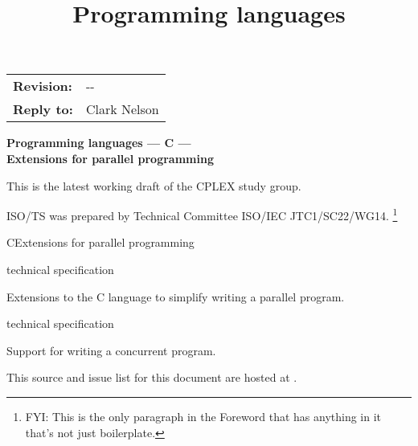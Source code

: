 \documentclass[
	techspec,	%
	final,		%
	notcopyright,	%
	letterpaper	%
	]{isov2}
\newcommand{\wgdocno}{}
\newcommand{\epptsno}{\placeholder{EPPTS}}
\renewcommand{\extrahead}{\Year-\Mo-\Dy{} \wgdocno}
\begin{document}
\begin{cover}
\begin{tabular}{l l}
\textbf{Revision:} & \extrahead \\
\textbf{Reply to:} & Clark Nelson
\end{tabular}

{\Huge
\bfseries
Programming languages --- C --- \\
Extensions for parallel programming
}

This is the latest working draft of the CPLEX study group.
\clearpage
\end{cover}


\begin{foreword}


ISO/TS
\epptsno{}
was prepared by Technical Committee ISO/IEC JTC1/SC22/WG14.
\footnote{FYI:
This is the only paragraph in the Foreword that has anything in it
that's not just boilerplate.
}

\fwdnopatents
\end{foreword}

\begin{introduction}
\intropatents
\end{introduction}

\title{Programming languages}{C}{Extensions for parallel programming}

\scopeclause
\begin{inscope}{technical specification}
\item
Extensions to the C language to simplify writing a parallel program.
\end{inscope}
\begin{outofscope}{technical specification}
\item
Support for writing a concurrent program.
\end{outofscope}

\normrefsclause
{}
\begin{nreferences}
\end{nreferences}




\pnum
This source and issue list for this document are hosted at
.
\end{document}
